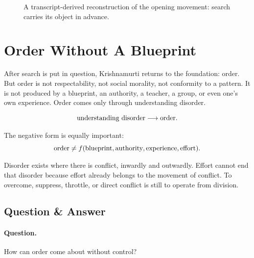 \documentclass[11pt,oneside]{book}
\begin{document}
\begin{figure}
\centering
{}
\caption{A transcript-derived reconstruction of the opening movement: search carries its object in advance.}
\end{figure}

\section{Order Without A Blueprint}

After search is put in question, Krishnamurti returns to the foundation: order. But order is not respectability, not social morality, not conformity to a pattern. It is not produced by a blueprint, an authority, a teacher, a group, or even one's own experience. Order comes only through understanding disorder.

\begin{equation}
\hbox{understanding disorder}
\longrightarrow
\hbox{order}.
\end{equation}

The negative form is equally important:
\begin{equation}
\hbox{order}
\neq
f(\hbox{blueprint},\hbox{authority},\hbox{experience},\hbox{effort}).
\end{equation}

Disorder exists where there is conflict, inwardly and outwardly. Effort cannot end that disorder because effort already belongs to the movement of conflict. To overcome, suppress, throttle, or direct conflict is still to operate from division.

\subsection{Question \& Answer}

\paragraph{Question.}
How can order come about without control?
\end{document}
